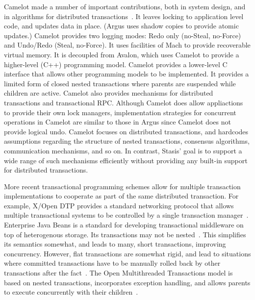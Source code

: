 \documentclass[letterpaper,twocolumn,10pt]{article}
\newcommand{\yads}{Stasis'\xspace}
\begin{document}

Camelot made a number of important
contributions, both in system design, and in algorithms for
distributed transactions~\cite{camelot}.  It leaves locking to application level code,
and updates data in place.  (Argus uses shadow copies to provide
atomic updates.)  Camelot provides two logging modes: Redo only
(no-Steal, no-Force) and Undo/Redo (Steal, no-Force).  It uses 
facilities of Mach to provide recoverable virtual memory.  It
is decoupled from Avalon, which uses Camelot to provide a
higher-level (C++) programming model.  Camelot provides a lower-level
C interface that allows other programming models to be
implemented.  It provides a limited form of closed nested transactions
where parents are suspended while children are active.  Camelot also
provides mechanisms for distributed transactions and transactional
RPC.  Although Camelot does allow appliactions to provide their own lock 
managers, implementation strategies for concurrent operations 
in Camelot are similar to those
in Argus since Camelot does not provide logical undo.  Camelot focuses
on distributed transactions, and hardcodes
assumptions regarding the structure of nested transactions, consensus
algorithms, communication mechanisms, and so on.  In contrast, \yads
goal is to support a wide range of such mechanisms efficiently without  
providing any built-in support for distributed transactions.

More recent transactional programming schemes allow for multiple
transaction implementations to cooperate as part of the same
distributed transaction.  For example, X/Open DTP provides a standard
networking protocol that allows multiple transactional systems to be
controlled by a single transaction manager~\cite{something}.
Enterprise Java Beans is a standard for developing transactional
middleware on top of heterogenous storage.  Its
transactions may not be nested~\cite{something}.  This simplifies its
semantics somewhat, and leads to many, short transactions, 
improving concurrency.  However, flat transactions are somewhat rigid, and lead to
situations where committed transactions have to be manually rolled
back by other transactions after the fact~\cite{ejbCritique}.  The Open
Multithreaded Transactions model is based on nested transactions,
incorporates exception handling, and allows parents to execute
concurrently with their children~\cite{omtt}.
\end{document}
